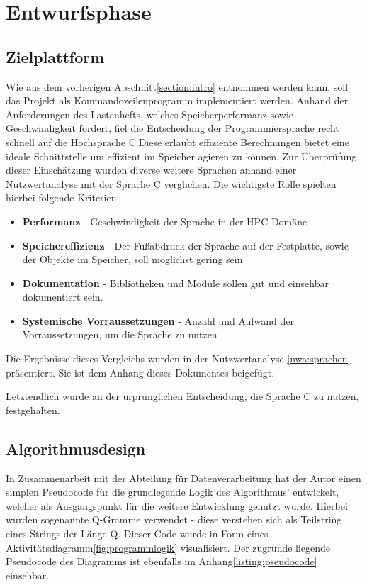 \section{Entwurfsphase}


\subsection{Zielplattform}
Wie aus dem vorherigen Abschnitt\ref{section:intro} entnommen werden kann, soll das Projekt als Kommandozeilenprogramm
implementiert werden. Anhand der Anforderungen des Lastenhefts, welches Speicherperformanz sowie Geschwindigkeit fordert,
fiel die Entscheidung der Programmiersprache recht schnell auf die Hochsprache C.Diese erlaubt effiziente Berechnungen bietet eine ideale Schnittstelle um effizient im Speicher agieren zu können.
Zur Überprüfung dieser Einschätzung wurden diverse weitere Sprachen anhand einer
Nutzwertanalyse mit der Sprache C verglichen. Die wichtigste Rolle spielten hierbei folgende Kriterien:
\begin{itemize}
    \item \textbf{Performanz} - Geschwindigkeit der Sprache in der HPC Domäne
    \item \textbf{Speichereffizienz} - Der Fußabdruck der Sprache auf der Festplatte, sowie der Objekte im Speicher, soll möglichst gering sein
    \item \textbf{Dokumentation} - Bibliotheken und Module sollen gut und einsehbar dokumentiert sein.
    \item \textbf{Systemische Vorraussetzungen} - Anzahl und Aufwand der Vorraussetzungen, um die Sprache zu nutzen
\end{itemize}

Die Ergebnisse dieses Vergleichs wurden in der Nutzwertanalyse \ref{nwa:sprachen} präsentiert.
Sie ist dem Anhang dieses Dokumentes beigefügt.\par
Letztendlich wurde an der urprünglichen Entscheidung, die Sprache C zu nutzen, festgehalten.

\subsection{Algorithmusdesign}
In Zusammenarbeit mit der Abteilung für Datenverarbeitung hat der Autor einen simplen
Pseudocode für die grundlegende Logik des Algorithmus' entwickelt, welcher als Ausgangspunkt
für die weitere Entwicklung genutzt wurde. Hierbei wurden sogenannte Q-Gramme verwendet - 
diese verstehen sich als Teilstring eines Strings der Länge Q. Dieser Code wurde in Form eines
Aktivitätsdiagramm\ref{fig:programmlogik} visualisiert. Der zugrunde liegende  Pseudocode des Diagramms ist ebenfalls im Anhang\ref{listing:pseudocode} einsehbar.



